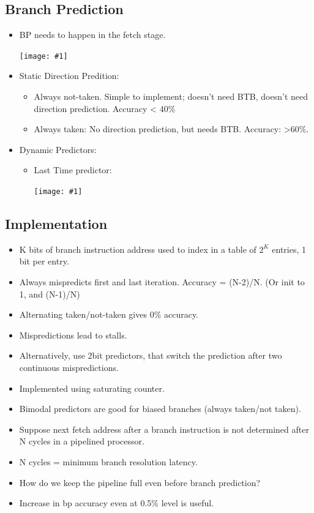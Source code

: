 \documentclass{report}
\newcommand{\mygraphic}[1]{
\begin{center}
    \texttt{[image: \#1]}
\end{center}
}
\begin{document}
\subsection{Branch Prediction}
\begin{itemize}
\item BP needs to happen in the fetch stage. 
\mygraphic{rsrc/branchpred.png}
\item Static Direction Predition: 
\begin{itemize}
    \item Always not-taken. Simple to implement; doesn't need BTB, doesn't need direction prediction. Accuracy < 40\%
    \item Always taken: No direction prediction, but needs BTB. Accuracy: >60\%.
\end{itemize}
\item Dynamic Predictors:
\begin{itemize}
    \item Last Time predictor: 
    \mygraphic{rsrc/statebp.png}
\end{itemize}
\end{itemize}
\subsection{Implementation}
\begin{itemize}
\item K bits of branch instruction address used to index in a table of $2^K$ entries, 1 bit per entry.
\item Always mispredicts first and last iteration. Accuracy = (N-2)/N. (Or init to 1, and (N-1)/N)
\item Alternating taken/not-taken gives 0\% accuracy.
\item Mispredictions lead to stalls.
\item Alternatively, use 2bit predictors, that switch the prediction after two continuous mispredictions.
\item Implemented using saturating counter.
\item Bimodal predictors are good for biased branches (always taken/not taken).
\item Suppose next fetch address after a branch instruction is not determined after N cycles in a pipelined processor.
\item N cycles = minimum branch resolution latency.
\item How do we keep the pipeline full even before branch prediction?
\item Increase in bp accuracy even at 0.5\% level is useful.
\end{itemize}
\end{document}

